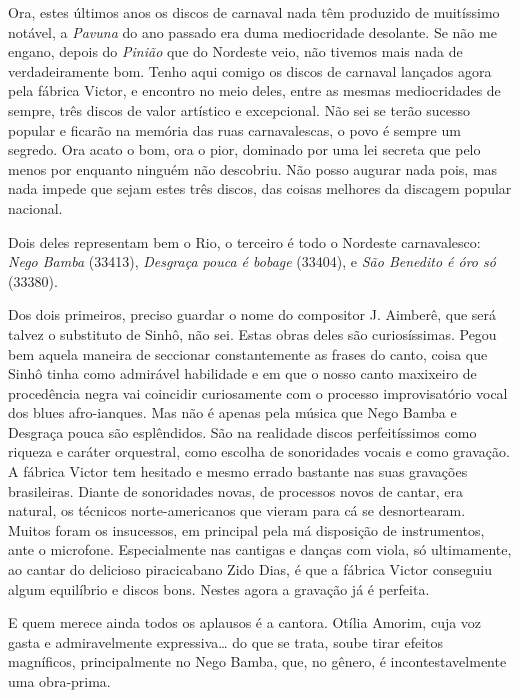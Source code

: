 Ora, estes últimos anos os discos de carnaval nada têm produzido de
muitíssimo notável, a \emph{Pavuna} do ano passado era duma mediocridade
desolante. Se não me engano, depois do \emph{Pinião} que do Nordeste
veio, não tivemos mais nada de verdadeiramente bom. Tenho aqui comigo os
discos de carnaval lançados agora pela fábrica Victor, e encontro no
meio deles, entre as mesmas mediocridades de sempre, três discos de
valor artístico e excepcional. Não sei se terão sucesso popular e
ficarão na memória das ruas carnavalescas, o povo é sempre um segredo.
Ora acato o bom, ora o pior, dominado por uma lei secreta que pelo menos
por enquanto ninguém não descobriu. Não posso augurar nada pois, mas
nada impede que sejam estes três discos, das coisas melhores da discagem
popular nacional.

Dois deles representam bem o Rio, o terceiro é todo o Nordeste
carnavalesco: \emph{Nego Bamba} (33413), \emph{Desgraça pouca é bobage}
(33404), e \emph{São Benedito é óro só} (33380).

Dos dois primeiros, preciso guardar o nome do compositor J. Aimberê, que
será talvez o substituto de Sinhô, não sei. Estas obras deles são
curiosíssimas. Pegou bem aquela maneira de seccionar constantemente as
frases do canto, coisa que Sinhô tinha como admirável habilidade e em
que o nosso canto maxixeiro de procedência negra vai coincidir
curiosamente com o processo improvisatório vocal dos blues afro-ianques.
Mas não é apenas pela música que Nego Bamba e Desgraça pouca são
esplêndidos. São na realidade discos perfeitíssimos como riqueza e
caráter orquestral, como escolha de sonoridades vocais e como gravação.
A fábrica Victor tem hesitado e mesmo errado bastante nas suas gravações
brasileiras. Diante de sonoridades novas, de processos novos de cantar,
era natural, os técnicos norte-americanos que vieram para cá se
desnortearam. Muitos foram os insucessos, em principal pela má
disposição de instrumentos, ante o microfone. Especialmente nas cantigas
e danças com viola, só ultimamente, ao cantar do delicioso piracicabano
Zido Dias, é que a fábrica Victor conseguiu algum equilíbrio e discos
bons. Nestes agora a gravação já é perfeita.

E quem merece ainda todos os aplausos é a cantora. Otília Amorim, cuja
voz gasta e admiravelmente expressiva\ldots{} do que se trata, soube tirar
efeitos magníficos, principalmente no Nego Bamba, que, no gênero, é
incontestavelmente uma obra-prima.

